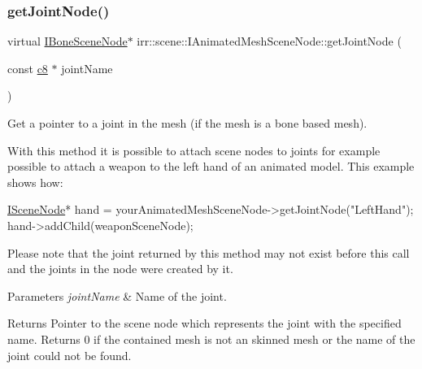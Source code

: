 \subsubsection{\texorpdfstring{get\+Joint\+Node()}{getJointNode()}\hspace{0.1cm}{\footnotesize\ttfamily [2/2]}}
{\footnotesize\ttfamily virtual \hyperlink{classirr_1_1scene_1_1IBoneSceneNode}{I\+Bone\+Scene\+Node}$\ast$ irr\+::scene\+::\+I\+Animated\+Mesh\+Scene\+Node\+::get\+Joint\+Node (\begin{DoxyParamCaption}\item[{const \hyperlink{namespaceirr_a9395eaea339bcb546b319e9c96bf7410}{c8} $\ast$}]{joint\+Name }\end{DoxyParamCaption})\hspace{0.3cm}{\ttfamily [pure virtual]}}



Get a pointer to a joint in the mesh (if the mesh is a bone based mesh). 

With this method it is possible to attach scene nodes to joints for example possible to attach a weapon to the left hand of an animated model. This example shows how\+: 
\begin{DoxyCode}
\hyperlink{classirr_1_1scene_1_1ISceneNode_a9894d951df2f720924f891e0a7b9fac2}{ISceneNode}* hand =
    yourAnimatedMeshSceneNode->getJointNode(\textcolor{stringliteral}{"LeftHand"});
hand->addChild(weaponSceneNode);
\end{DoxyCode}
 Please note that the joint returned by this method may not exist before this call and the joints in the node were created by it. 
\begin{DoxyParams}{Parameters}
{\em joint\+Name} & Name of the joint. \\
\hline
\end{DoxyParams}
\begin{DoxyReturn}{Returns}
Pointer to the scene node which represents the joint with the specified name. Returns 0 if the contained mesh is not an skinned mesh or the name of the joint could not be found. 
\end{DoxyReturn}
\mbox{\label{classirr_1_1scene_1_1IAnimatedMeshSceneNode_a3271dc33b1911d637b05c58f17398a0a}} 
